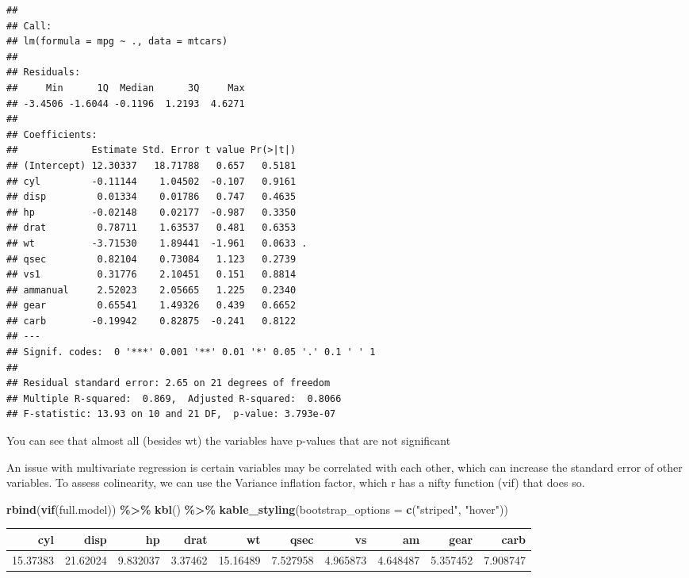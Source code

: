 \documentclass[
]{article}
\newenvironment{Shaded}{\begin{snugshade}}{\end{snugshade}}
\newcommand{\AttributeTok}[1]{\textcolor[rgb]{0.13,0.29,0.53}{#1}}
\newcommand{\FunctionTok}[1]{\textcolor[rgb]{0.13,0.29,0.53}{\textbf{#1}}}
\newcommand{\NormalTok}[1]{#1}
\newcommand{\SpecialCharTok}[1]{\textcolor[rgb]{0.81,0.36,0.00}{\textbf{#1}}}
\newcommand{\StringTok}[1]{\textcolor[rgb]{0.31,0.60,0.02}{#1}}
\begin{document}
\begin{verbatim}
## 
## Call:
## lm(formula = mpg ~ ., data = mtcars)
## 
## Residuals:
##     Min      1Q  Median      3Q     Max 
## -3.4506 -1.6044 -0.1196  1.2193  4.6271 
## 
## Coefficients:
##             Estimate Std. Error t value Pr(>|t|)  
## (Intercept) 12.30337   18.71788   0.657   0.5181  
## cyl         -0.11144    1.04502  -0.107   0.9161  
## disp         0.01334    0.01786   0.747   0.4635  
## hp          -0.02148    0.02177  -0.987   0.3350  
## drat         0.78711    1.63537   0.481   0.6353  
## wt          -3.71530    1.89441  -1.961   0.0633 .
## qsec         0.82104    0.73084   1.123   0.2739  
## vs1          0.31776    2.10451   0.151   0.8814  
## ammanual     2.52023    2.05665   1.225   0.2340  
## gear         0.65541    1.49326   0.439   0.6652  
## carb        -0.19942    0.82875  -0.241   0.8122  
## ---
## Signif. codes:  0 '***' 0.001 '**' 0.01 '*' 0.05 '.' 0.1 ' ' 1
## 
## Residual standard error: 2.65 on 21 degrees of freedom
## Multiple R-squared:  0.869,  Adjusted R-squared:  0.8066 
## F-statistic: 13.93 on 10 and 21 DF,  p-value: 3.793e-07
\end{verbatim}

You can see that almost all (besides wt) the variables have p-values
that are not significant

An issue with multivariate regression is certain variables may be
correlated with each other, which can increase the standard error of
other variables. To assess colinearity, we can use the Variance
inflation factor, which r has a nifty function (vif) that does so.

\begin{Shaded}
\begin{Highlighting}[]
\FunctionTok{rbind}\NormalTok{(}\FunctionTok{vif}\NormalTok{(full.model))  }\SpecialCharTok{\%\textgreater{}\%}
  \FunctionTok{kbl}\NormalTok{() }\SpecialCharTok{\%\textgreater{}\%}
  \FunctionTok{kable\_styling}\NormalTok{(}\AttributeTok{bootstrap\_options =} \FunctionTok{c}\NormalTok{(}\StringTok{"striped"}\NormalTok{, }\StringTok{"hover"}\NormalTok{))}
\end{Highlighting}
\end{Shaded}

\begin{table}
\centering
\begin{tabular}[t]{r|r|r|r|r|r|r|r|r|r}
\hline
cyl & disp & hp & drat & wt & qsec & vs & am & gear & carb\\
\hline
15.37383 & 21.62024 & 9.832037 & 3.37462 & 15.16489 & 7.527958 & 4.965873 & 4.648487 & 5.357452 & 7.908747\\
\hline
\end{tabular}
\end{table}
\end{document}
